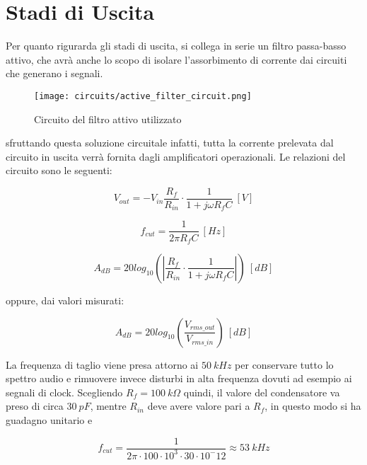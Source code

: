 \chapter{Stadi di Uscita}


Per quanto rigurarda gli stadi di uscita, si collega in serie un filtro passa-basso attivo,
che avrà anche lo scopo di isolare l'assorbimento di corrente dai circuiti che generano i
segnali.

\begin{figure}[H]
    \centering
    \texttt{[image: circuits/active\_filter\_circuit.png]}
    \caption{Circuito del filtro attivo utilizzato}
    \label{active_filter_circuit}
\end{figure}

sfruttando questa soluzione circuitale infatti, tutta la corrente prelevata dal circuito in
uscita verrà fornita dagli amplificatori operazionali. Le relazioni del circuito sono le
seguenti:

\begin{equation}\label{active_filter}
    V_{out}=-V_{in}\frac{R_f}{R_{in}}\cdot\frac{1}{1+j\omega R_fC}\ [V]
\end{equation}

\begin{equation}\label{fcut}
    f_{cut}=\frac{1}{2\pi R_fC}\ [Hz]
\end{equation}

\begin{equation}\label{gain1}
    A_{dB}=20log_{10}\left(\left|\frac{R_f}{R_{in}}\cdot\frac{1}{1+j\omega R_fC}\right|\right)\ [dB]
\end{equation}

oppure, dai valori misurati:

\begin{equation}\label{gain2}
    A_{dB}=20log_{10}\left(\frac{V_{rms\_out}}{V_{rms\_in}}\right)\ [dB]
\end{equation}

La frequenza di taglio viene presa attorno ai $50\ kHz$ per conservare tutto lo spettro audio
e rimuovere invece disturbi in alta frequenza dovuti ad esempio ai segnali di clock.
Scegliendo $R_f=100\ k\Omega$ quindi, il valore del condensatore va preso di circa $30\ pF$,
mentre $R_{in}$ deve avere valore pari a $R_f$, in questo modo si ha guadagno unitario e

\begin{equation}
    f_{cut}=\frac{1}{2\pi\cdot100\cdot10^3\cdot30\cdot10^-12}\approx53\ kHz
\end{equation}

